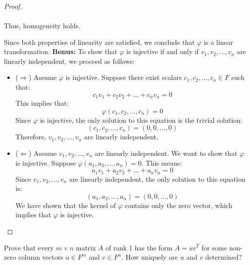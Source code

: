 \documentclass[openany]{book}
\begin{document}
\begin{proof}
\begin{enumerate}
\[\begin{aligned}
   \end{aligned}
   \]
   Thus, homogeneity holds.
\end{enumerate}
Since both properties of linearity are satisfied, we conclude that $\varphi$ is a linear transformation.
\newline
\textbf{Bonus:} To show that $\varphi$ is injective if and only if $v_1, v_2, \ldots, v_n$ are linearly independent, we proceed as follows:
\begin{itemize}
\item ($\Rightarrow$) Assume $\varphi$ is injective. Suppose there exist scalars $c_1, c_2, \ldots, c_n \in F$ such that:
   $$c_1 v_1 + c_2 v_2 + \ldots + c_n v_n = 0$$
   This implies that:
   $$\varphi(c_1, c_2, \ldots, c_n) = 0$$
   Since $\varphi$ is injective, the only solution to this equation is the trivial solution:
   $$(c_1, c_2, \ldots, c_n) = (0, 0, \ldots, 0)$$
   Therefore, $v_1, v_2, \ldots, v_n$ are linearly independent.
\item ($\Leftarrow$) Assume $v_1, v_2, \ldots, v_n$ are linearly independent. We want to show that $\varphi$ is injective. Suppose $\varphi(a_1, a_2, \ldots, a_n) = 0$. This means:
   $$a_1 v_1 + a_2 v_2 + \ldots + a_n v_n = 0$$
   Since $v_1, v_2, \ldots, v_n$ are linearly independent, the only solution to this equation is:
   $$(a_1, a_2, \ldots, a_n) = (0, 0, \ldots, 0)$$
   We have shown that the kernel of $\varphi$ contains only the zero vector, which implies that $\varphi$ is injective.
\end{itemize}
\end{proof}
\begin{exercise}
    Prove that every $m \times n$ matrix $A$ of rank 1 has the form $A = uv^T$ for some non-zero column vectors $u \in F^m$ and $v \in F^n$. How uniquely are $u$ and $v$ determined?
\end{exercise}
\end{document}

